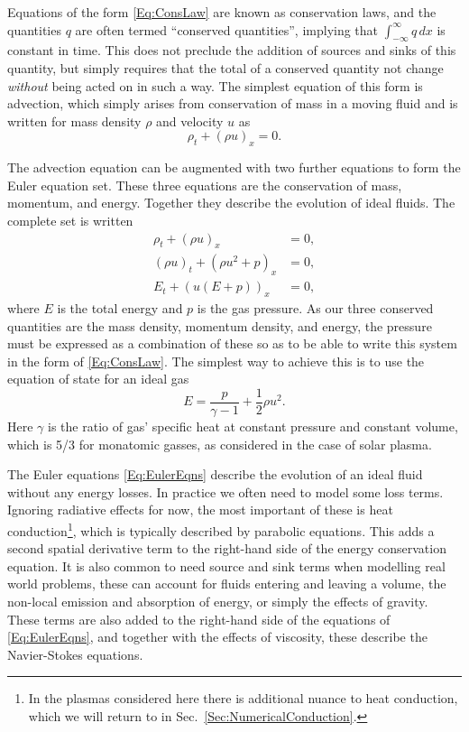 Equations of the form \eqref{Eq:ConsLaw} are known as conservation laws, and the quantities $q$ are often termed ``conserved quantities'', implying that $\int_{-\infty}^{\infty} q\, dx$ is constant in time.
This does not preclude the addition of sources and sinks of this quantity, but simply requires that the total of a conserved quantity not change \emph{without} being acted on in such a way.
The simplest equation of this form is advection, which simply arises from conservation of mass in a moving fluid and is written for mass density $\rho$ and velocity $u$ as
\begin{equation}\label{Eq:Advection}
    \rho_t + (\rho u)_x = 0.
\end{equation}

The advection equation can be augmented with two further equations to form the Euler equation set.
These three equations are the conservation of mass, momentum, and energy.
Together they describe the evolution of ideal fluids.
The complete set is written
\begin{equation}\label{Eq:EulerEqns}
\begin{split}
    \rho_t + (\rho u)_x &= 0,\\
    (\rho u)_t + (\rho u^2 + p)_x &= 0,\\
    E_t + (u(E + p))_x &= 0,
\end{split}
\end{equation}
where $E$ is the total energy and $p$ is the gas pressure.
As our three conserved quantities are the mass density, momentum density, and energy, the pressure must be expressed as a combination of these so as to be able to write this system in the form of \eqref{Eq:ConsLaw}.
The simplest way to achieve this is to use the equation of state for an ideal gas
\begin{equation}
    E = \frac{p}{\gamma-1} + \frac{1}{2}\rho u^2.
\end{equation}
Here $\gamma$ is the ratio of gas' specific heat at constant pressure and constant volume, which is 5/3 for monatomic gasses, as considered in the case of solar plasma.

The Euler equations \eqref{Eq:EulerEqns} describe the evolution of an ideal fluid without any energy losses.
In practice we often need to model some loss terms.
Ignoring radiative effects for now, the most important of these is heat conduction\footnote{In the plasmas considered here there is additional nuance to heat conduction, which we will return to in Sec.~\ref{Sec:NumericalConduction}.}, which is typically described by parabolic equations.
This adds a second spatial derivative term to the right-hand side of the energy conservation equation.
It is also common to need source and sink terms when modelling real world problems, these can account for fluids entering and leaving a volume, the non-local emission and absorption of energy, or simply the effects of gravity.
These terms are also added to the right-hand side of the equations of \eqref{Eq:EulerEqns}, and together with the effects of viscosity, these describe the Navier-Stokes equations.

